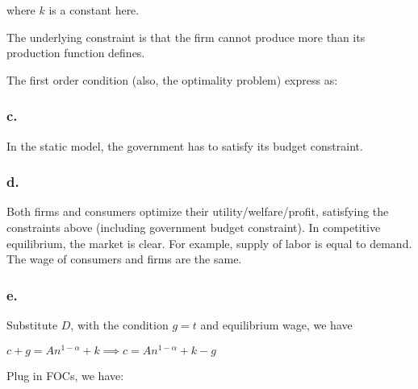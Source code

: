 \documentclass{article}
\begin{document}
where $k$ is a constant here.

The underlying constraint is that the firm cannot produce more than its production function defines.

The first order condition (also, the optimality problem) express as:


\subsubsection*{\textrm{c.}}

In the static model, the government has to satisfy its budget constraint.


\subsubsection*{\textrm{d.}}

Both firms and consumers optimize their utility/welfare/profit, satisfying the constraints above (including government budget constraint). In competitive equilibrium, the market is clear. For example, supply of labor is equal to demand. The wage of consumers and firms are the same. 

\subsubsection*{\textrm{e.}}

Substitute $D$, with the condition $g=t$ and equilibrium wage, we have 

$c+g=An^{1-\alpha}+k\implies c=An^{1-\alpha}+k-g$

Plug in FOCs, we have: \\

\fbox{%
\parbox[c]{\textwidth}{\
\begin{equation*}
    \begin{aligned}
        \phi\left(An^{1-\alpha}+k-g\right)-A\left(1-\alpha\right)n^{-\alpha}\left(1-n\right)=0     
    \end{aligned}
\end{equation*}%
}}
\end{document}
